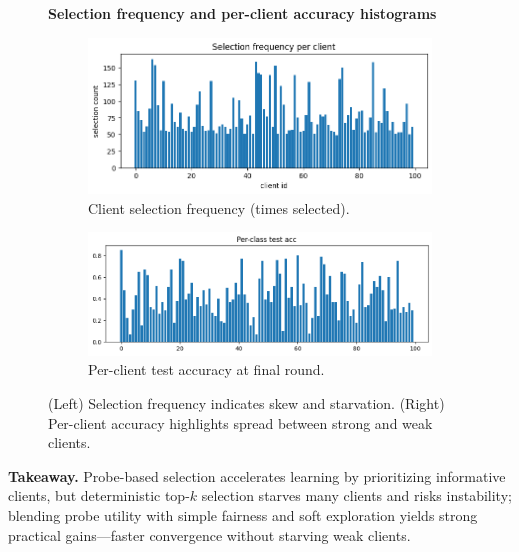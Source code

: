 \documentclass[10pt,twocolumn,letterpaper]{article}
\begin{document}
\label{sec:plots-hist}
\begin{figure}[htbp]
\noindent\textbf{Selection frequency and per-client accuracy histograms}

  \centering
  \begin{subfigure}[b]{0.48\linewidth}
    \centering
    \includegraphics[width=\linewidth]{figs/selection_frequency.png}
    \caption{Client selection frequency (times selected).}
    \label{fig:sel-hist}
  \end{subfigure}
  \hfill
  \begin{subfigure}[b]{0.48\linewidth}
    \centering
    \includegraphics[width=\linewidth]{figs/per_class_test_acc.png}
    \caption{Per-client test accuracy at final round.}
    \label{fig:acc-hist}
  \end{subfigure}
  \caption{(Left) Selection frequency indicates skew and starvation. (Right) Per-client accuracy highlights spread between strong and weak clients.}
  \label{fig:histograms}
\end{figure}
\FloatBarrier











\vspace{1mm}
\noindent\textbf{Takeaway.} Probe-based selection accelerates learning by prioritizing informative clients, but deterministic top-$k$ selection starves many clients and risks instability; blending probe utility with simple fairness and soft exploration yields strong practical gains—faster convergence without starving weak clients.
\end{document}
